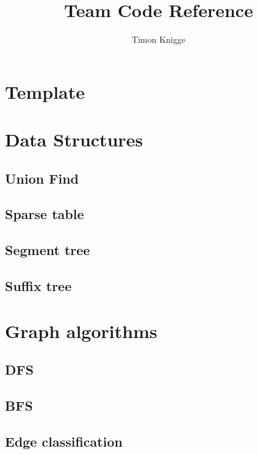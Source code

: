 \documentclass[a4paper]{article}
\title{Team Code Reference}
\author{
    Timon Knigge
}
\newcommand{\includesnippet}[2]{

}
\begin{document}
  \maketitle
  \tableofcontents
  \clearpage
    
  \section{Template}
    \includesnippet{snippets/header.h}{C++}
    
  \section{Data Structures}
    
    \subsection{Union Find}
    \includesnippet{snippets/unionfind.cpp}{C++}
    
    \subsection{Sparse table}
    
    \subsection{Segment tree}
    
    \subsection{Suffix tree}
    
  \section{Graph algorithms}
  
    \subsection{DFS}
    
    \subsection{BFS}
    
    \subsection{Edge classification}
    
\end{document}

